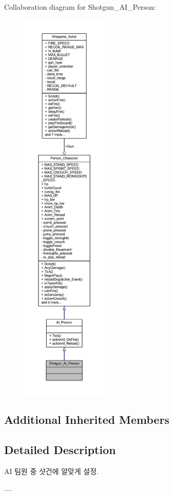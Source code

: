 Collaboration diagram for Shotgun\+\_\+\+A\+I\+\_\+\+Person\+:\nopagebreak
\begin{figure}[H]
\begin{center}
\leavevmode
\includegraphics[height=550pt]{class_shotgun___a_i___person__coll__graph}
\end{center}
\end{figure}
\subsection*{Additional Inherited Members}


\subsection{Detailed Description}
AI 팀원 중 샷건에 알맞게 설정. 

.... 